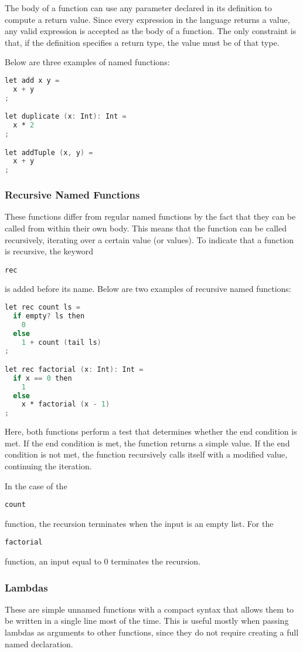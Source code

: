 \documentclass{article}
\def\code#1{\begin{footnotesize}\texttt{#1}\end{footnotesize}}
\begin{document}
The body of a function can use any parameter declared in its definition to compute a return value.
Since every expression in the language returns a value, any valid expression is accepted as the body of a function.
The only constraint is that, if the definition specifies a return type, the value must be of that type.

Below are three examples of named functions:

\begin{lstlisting}[language=V]
let add x y =
  x + y
;

let duplicate (x: Int): Int =
  x * 2
;

let addTuple (x, y) =
  x + y
;
\end{lstlisting}

\subsubsection{Recursive Named Functions}

These functions differ from regular named functions by the fact that they can be called from within their own body.
This means that the function can be called recursively, iterating over a certain value (or values).
To indicate that a function is recursive, the keyword \code{rec} is added before its name.
Below are two examples of recursive named functions:

\begin{lstlisting}[language=V]
let rec count ls =
  if empty? ls then
    0
  else
    1 + count (tail ls)
;

let rec factorial (x: Int): Int =
  if x == 0 then
    1
  else
    x * factorial (x - 1)
;
\end{lstlisting}

Here, both functions perform a test that determines whether the end condition is met.
If the end condition is met, the function returns a simple value.
If the end condition is not met, the function recursively calls itself with a modified value, continuing the iteration.

In the case of the \code{count} function, the recursion terminates when the input is an empty list.
For the \code{factorial} function, an input equal to 0 terminates the recursion.

\subsubsection{Lambdas}

These are simple unnamed functions with a compact syntax that allows them to be written in a single line most of the time.
This is useful mostly when passing lambdas as arguments to other functions, since they do not require creating a full named declaration.
\end{document}
